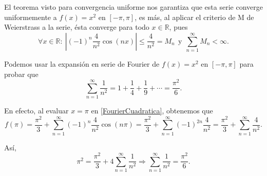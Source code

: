 \begin{ejemplo}
El teorema visto para convergencia uniforme nos garantiza que esta serie converge uniformemente a $f(x) = x^2$ en $[-\pi,\pi]$, es más, al aplicar el criterio de M de Weierstrass a la serie, ésta converge para todo $x \in \mathbb{R}$, pues
$$\forall  x \in \mathbb{R}: ~ \left|(-1)^n \frac{4}{n^2} \cos(nx)\right| \leq \frac{4}{n^2} = M_n ~~\mbox{y}~~  \sum\limits_{n=1}^{\infty} M_n < \infty.$$

\end{ejemplo}

Podemos usar la expansión en serie de Fourier de $f(x) = x^2$ en $[-\pi,\pi]$ para probar que 
$$\sum_{n=1}^{\infty} \frac{1}{n^2} = 1 + \frac{1}{4} + \frac{1}{9} + \cdots = \frac{\pi^2}{6}.$$

En efecto, al evaluar $x = \pi$ en \eqref{FourierCuadratica}, obtenemos que 
$$f(\pi) = \frac{\pi^2}{3} + \sum_{n=1}^{\infty} (-1)^n \frac{4}{n^2} \cos(n\pi) = \frac{\pi^2}{3} + \sum_{n=1}^{\infty} (-1)^{2n} \frac{4}{n^2} = \frac{\pi^2}{3} +  \sum_{n=1}^{\infty} \frac{4}{n^2}.$$

Así,
$$\pi^2 = \frac{\pi^2}{3} + 4 \sum_{n=1}^{\infty} \frac{1}{n^2} \Rightarrow \sum_{n=1}^{\infty} \frac{1}{n^2} = \frac{\pi^2}{6}.$$


